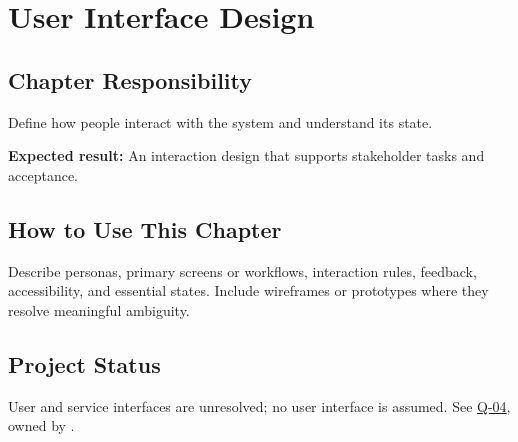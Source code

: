 \chapter{User Interface Design}
\section{Chapter Responsibility}
\label{Section:UserInterfaceDesignResponsibility}
Define how people interact with the system and understand its state.

\noindent\textbf{Expected result:} An interaction design that supports stakeholder tasks and acceptance.

\section{How to Use This Chapter}
Describe personas, primary screens or workflows, interaction rules, feedback, accessibility, and essential states. Include wireframes or prototypes where they resolve meaningful ambiguity.

\section{Project Status}
User and service interfaces are unresolved; no user interface is assumed.
See \hyperref[Question:Q-04]{Q-04}, owned by \DocumentOwner.
